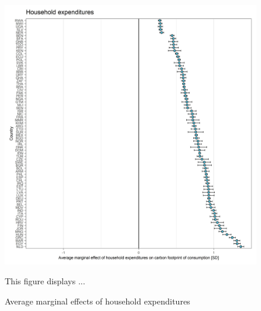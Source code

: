 \documentclass[12pt, a4paper]{article}
\newenvironment{subcaption}
{\strut
\vspace{-5pt}
\begin{minipage}[b]{0.9\textwidth}
  \hspace*{-\parindent}
  \footnotesize}
 {\end{minipage}}
\begin{document}
\begin{figure}[ht!]
  \centering
 \caption{Average marginal effects of household expenditures} \label{fig:D4_Expenditures}
  \includegraphics{Analysis_OLS_ME_Carbon_Footprint/AME_OLS_FP_log_hh_expenditures_USD_2014}
  \begin{subcaption}
    This figure displays ...
  \end{subcaption}

\end{figure}

\clearpage
\end{document}
